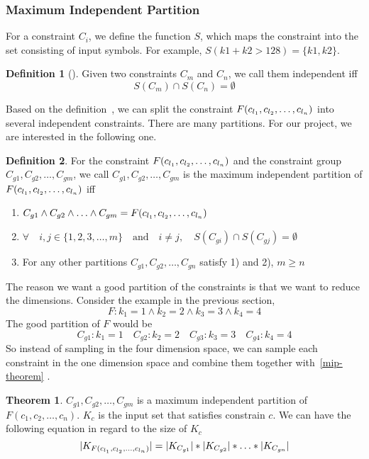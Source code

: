 \subsubsection{Maximum Independent Partition}

For a constraint $C_i$, we define the function $S$, which maps
the constraint into the set consisting of input symbols. For example, 
$S(k1 + k2 > 128) = \{k1, k2\}$.

\theoremstyle{definition}
\newtheorem{definition}{Definition}[section]

\begin{definition}[]
      \label{independentC}
      Given two constraints $C_m$ and $C_n$, we call them independent iff 
      $$S(C_m) \cap S(C_n) = \emptyset$$
\end{definition}

Based on the definition~\label{independentC}, we can split
the constraint $F(c_{l_{1}},c_{l_{2}},\ldots,c_{l_{n}})$ into several 
independent constraints. There are many partitions. For our project, 
we are interested in the following one.

\begin{definition}
      \label{Goodpartition}
      For the constraint $F(c_{l_{1}},c_{l_{2}},\ldots,c_{l_{n}})$ and 
      the constraint group
      $C_{g1}, C_{g2}, \ldots, C_{gm}$, we call  $C_{g1}, C_{g2}, \ldots, C_{gm}$
      is the maximum independent partition of $F(c_{l_{1}},c_{l_{2}},\ldots,c_{l_{n}})$ iff
      \begin{enumerate}
            \item $C_{g1} \land C_{g2} \land \ldots \land C_{gm} = F(c_{l_{1}},c_{l_{2}},\ldots,c_{l_{n}})$
            \item $\forall \quad i, j \in \{1, 2, 3, \ldots, m\} \quad \textrm{and} \quad 
                  i \neq j, \quad S(C_{gi}) \cap S(C_{gj}) = \emptyset $
            \item For any other partitions  $C_{g1}, C_{g2}, \ldots, C_{gn}$ satisfy 1) and
                  2), $m \geq n$    
      \end{enumerate}
      
\end{definition}

The reason we want a good partition of the constraints is that we want to 
reduce the dimensions. Consider the example in the previous section,
$$F: {k_1} = 1\land{k_2} = 2\land{k_3} = 3\land{k_4} = 4$$
The good partition of $F$ would be
$$C_{g1}: {k_1} = 1\quad C_{g2}: {k_2} = 2\quad C_{g3}: {k_3} = 3\quad C_{g4}: {k_4} = 4$$     
So instead of sampling in the four dimension space, we can
sample each constraint in the one dimension space and combine them
together with~\ref{mip-theorem} .
\newtheorem{theorem}{Theorem}[section]
\label{mip-theorem}
\begin{theorem}
      \label{IndependentConstraint}
$C_{g1}, C_{g2}, \ldots, C_{gm}$ is a maximum independent partition of $F(c_1,c_2,\ldots,c_n)$.
$K_c$ is the input set that satisfies constrain $c$. We can have the following
equation in regard to the size of $K_c$
$$|K_{F(c_{l_{1}},c_{l_{2}},\ldots,c_{l_{n}})}| = |K_{C_{g1}}|*|K_{C_{g2}}|*\ldots*|K_{C_{gn}}|$$
\end{theorem}

